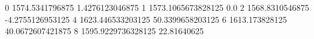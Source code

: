 0 1574.5341796875 1.4276123046875
1 1573.1065673828125 0.0
2 1568.8310546875 -4.2755126953125
4 1623.446533203125 50.3399658203125
6 1613.173828125 40.0672607421875
8 1595.9229736328125 22.81640625
